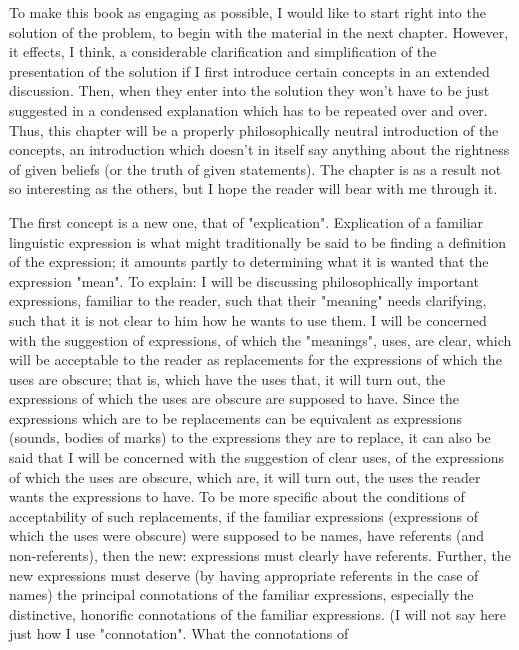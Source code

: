 \documentclass[10pt,twoside,draft]{memoir}
\begin{document}
To make this book as engaging as possible, I would like to start right 
into the solution of the problem, to begin with the material in the next 
chapter. However, it effects, I think, a considerable clarification and 
simplification of the presentation of the solution if I first introduce certain 
concepts in an extended discussion. Then, when they enter into the solution 
they won't have to be just suggested in a condensed explanation which has 
to be repeated over and over. Thus, this chapter will be a properly 
philosophically neutral introduction of the concepts, an introduction which 
doesn't in itself say anything about the rightness of given beliefs (or the 
truth of given statements). The chapter is as a result not so interesting as the 
others, but I hope the reader will bear with me through it. 

The first concept is a new one, that of "explication". Explication of a 
familiar linguistic expression is what might traditionally be said to be finding 
a definition of the expression; it amounts partly to determining what it is 
wanted that the expression "mean". To explain: I will be discussing 
philosophically important expressions, familiar to the reader, such that their 
"meaning" needs clarifying, such that it is not clear to him how he wants to 
use them. I will be concerned with the suggestion of expressions, of which 
the "meanings", uses, are clear, which will be acceptable to the reader as 
replacements for the expressions of which the uses are obscure; that is, 
which have the uses that, it will turn out, the expressions of which the uses 
are obscure are supposed to have. Since the expressions which are to be 
replacements can be equivalent as expressions (sounds, bodies of marks) to 
the expressions they are to replace, it can also be said that I will be 
concerned with the suggestion of clear uses, of the expressions of which the 
uses are obscure, which are, it will turn out, the uses the reader wants the 
expressions to have. To be more specific about the conditions of 
acceptability of such replacements, if the familiar expressions (expressions of 
which the uses were obscure) were supposed to be names, have referents 
(and non-referents), then the new: expressions must clearly have referents. 
Further, the new expressions must deserve (by having appropriate referents 
in the case of names) the principal connotations of the familiar expressions, 
especially the distinctive, honorific connotations of the familiar expressions. 
(I will not say here just how I use "connotation". What the connotations of 
\end{document}
